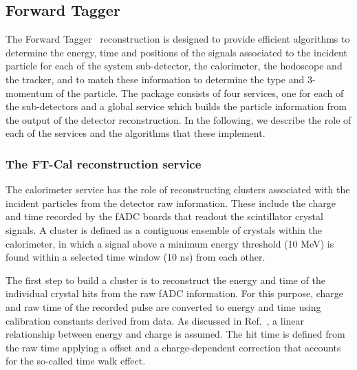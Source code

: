 \subsection{Forward Tagger}
The Forward Tagger~\cite{ft-nim} reconstruction is designed to provide efficient algorithms to determine the energy, time and positions of the signals associated to the incident particle for each of the system sub-detector, the calorimeter, the hodoscope and the tracker, and to match these information to determine the type and 3-momentum of the particle. The package consists of four services, one for each of the sub-detectors and a global service which builds the particle information from the output of the detector reconstruction. In the following, we describe the role of each of the services and the algorithms that these implement.

\subsubsection{The FT-Cal reconstruction service}
The calorimeter service has the role of reconstructing clusters associated with the incident particles from the detector raw information. These include the charge and time recorded by the fADC boards that readout the scintillator crystal signals. A cluster is defined as a contiguous ensemble of crystals within the calorimeter, in which a signal above a minimum energy threshold (10 MeV) is found within a selected time window (10 ns) from each other.

The first step to build a cluster is to reconstruct the energy and time of the individual crystal hits from the raw fADC information. For this purpose, charge and raw time of the recorded pulse are converted to energy and time using calibration constants derived from data. As discussed in Ref.~\cite{ft-nim}, a linear relationship between energy and charge is assumed. The hit time is defined from the raw time applying a offset and a charge-dependent correction that accounts for the so-called time walk effect.

